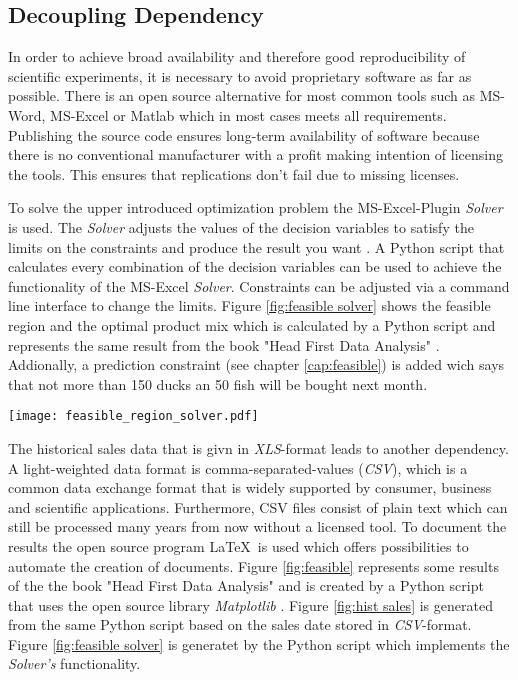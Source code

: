 \documentclass{article}
\begin{document}
\begin{multicols}{2}
\section{Decoupling Dependency}
In order to achieve broad availability and therefore good reproducibility of scientific experiments, it is necessary to avoid proprietary software as far as possible. There is an open source alternative for most common tools such as MS-Word, MS-Excel or Matlab which in most cases meets all requirements. Publishing the source code ensures long-term availability of software because there is no conventional manufacturer with a profit making intention of licensing the tools. This ensures that replications don't fail due to missing licenses.

To solve the upper introduced optimization problem the MS-Excel-Plugin \textit{Solver} is used. The \textit{Solver} adjusts the values of the decision variables to satisfy the limits on the constraints and produce the result you want \cite{microsoft}. A Python script that calculates every combination of the decision variables can be used to achieve the functionality of the MS-Excel \textit{Solver}. Constraints can be adjusted via a command line interface to change the limits. Figure \ref{fig:feasible solver} shows the feasible region and the optimal product mix which is calculated by a Python script and represents the same result from the book "Head First Data Analysis" \cite[p. 107]{micheal}. Addionally, a prediction constraint (see chapter \ref{cap:feasible}) is added wich says that not more than 150 ducks an 50 fish will be bought next month.

\begin{center}
\texttt{[image: feasible\_region\_solver.pdf]}
\label{fig:feasible solver}
\end{center}

The historical sales data that is givn in \textit{XLS}-format leads to another dependency. A light-weighted data format is comma-separated-values (\textit{CSV}), which is a common data exchange format that is widely supported by consumer, business and scientific applications. Furthermore, CSV files consist of plain text which can still be processed many years from now without a licensed tool. To document the results the open source program \LaTeX~is used which offers possibilities to automate the creation of documents. Figure \ref{fig:feasible} represents some results of the the book "Head First Data Analysis" and is created by a Python script that uses the open source library \textit{Matplotlib} \cite{matplot}. Figure \ref{fig:hist sales} is generated from the same Python script based on the sales date stored in \textit{CSV}-format. Figure \ref{fig:feasible solver} is generatet by the Python script which implements the \textit{Solver's} functionality.


\end{multicols}
\end{document}
